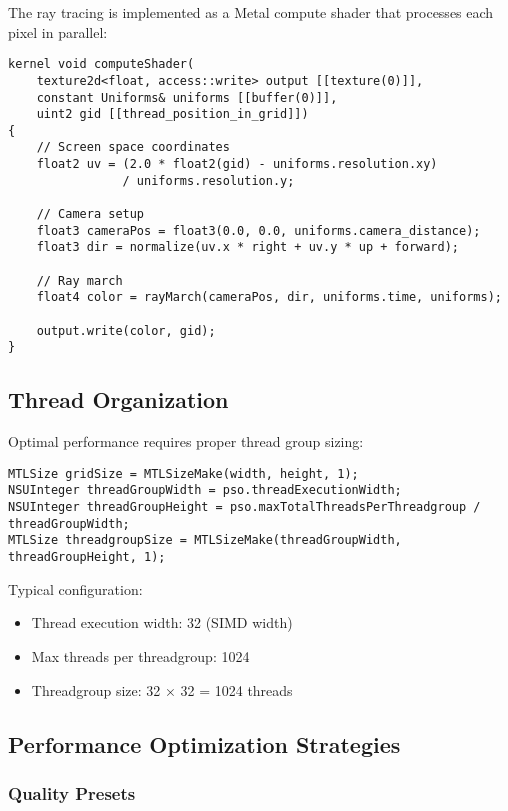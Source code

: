 \documentclass[12pt,a4paper]{article}
\theoremstyle{definition}
\theoremstyle{remark}
\begin{document}
The ray tracing is implemented as a Metal compute shader that processes each pixel in parallel:

\begin{lstlisting}[style=metalstyle, caption=Main compute kernel]
kernel void computeShader(
    texture2d<float, access::write> output [[texture(0)]],
    constant Uniforms& uniforms [[buffer(0)]],
    uint2 gid [[thread_position_in_grid]])
{
    // Screen space coordinates
    float2 uv = (2.0 * float2(gid) - uniforms.resolution.xy) 
                / uniforms.resolution.y;
    
    // Camera setup
    float3 cameraPos = float3(0.0, 0.0, uniforms.camera_distance);
    float3 dir = normalize(uv.x * right + uv.y * up + forward);
    
    // Ray march
    float4 color = rayMarch(cameraPos, dir, uniforms.time, uniforms);
    
    output.write(color, gid);
}
\end{lstlisting}

\subsection{Thread Organization}

Optimal performance requires proper thread group sizing:

\begin{lstlisting}[style=metalstyle, caption=Thread group configuration]
MTLSize gridSize = MTLSizeMake(width, height, 1);
NSUInteger threadGroupWidth = pso.threadExecutionWidth;
NSUInteger threadGroupHeight = pso.maxTotalThreadsPerThreadgroup / threadGroupWidth;
MTLSize threadgroupSize = MTLSizeMake(threadGroupWidth, threadGroupHeight, 1);
\end{lstlisting}

Typical configuration:
\begin{itemize}
    \item Thread execution width: 32 (SIMD width)
    \item Max threads per threadgroup: 1024
    \item Threadgroup size: 32 × 32 = 1024 threads
\end{itemize}

\subsection{Performance Optimization Strategies}

\subsubsection{Quality Presets}
\end{document}

